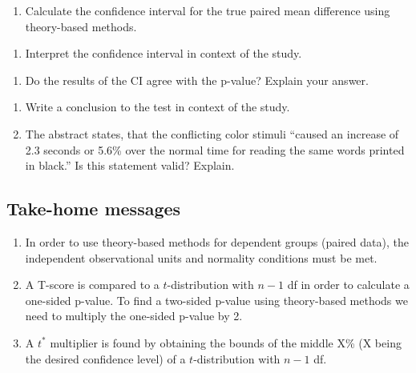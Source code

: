 \documentclass[
]{report}
\providecommand{\tightlist}{%
  \setlength{\itemsep}{0pt}\setlength{\parskip}{0pt}}
\begin{document}
\vspace{0.6in}

\begin{enumerate}
\def\labelenumi{\arabic{enumi}.}
\setcounter{enumi}{12}
\tightlist
\item
  Calculate the confidence interval for the true paired mean difference using theory-based methods.
\end{enumerate}

\newpage

\begin{enumerate}
\def\labelenumi{\arabic{enumi}.}
\setcounter{enumi}{13}
\tightlist
\item
  Interpret the confidence interval in context of the study.
\end{enumerate}

\vspace{1in}

\begin{enumerate}
\def\labelenumi{\arabic{enumi}.}
\setcounter{enumi}{14}
\tightlist
\item
  Do the results of the CI agree with the p-value? Explain your answer.
\end{enumerate}

\vspace{0.5in}

\begin{enumerate}
\def\labelenumi{\arabic{enumi}.}
\setcounter{enumi}{15}
\item
  Write a conclusion to the test in context of the study.
  \vspace{0.6in}
\item
  The abstract states, that the conflicting color stimuli ``caused an increase of 2.3 seconds or 5.6\% over the normal time for reading the same words printed in black.'' Is this statement valid? Explain.
  \vspace{0.6in}
\end{enumerate}

\hypertarget{take-home-messages-18}{%
\subsection{Take-home messages}\label{take-home-messages-18}}

\begin{enumerate}
\def\labelenumi{\arabic{enumi}.}
\item
  In order to use theory-based methods for dependent groups (paired data), the independent observational units and normality conditions must be met.
\item
  A T-score is compared to a \(t\)-distribution with \(n - 1\) df in order to calculate a one-sided p-value. To find a two-sided p-value using theory-based methods we need to multiply the one-sided p-value by 2.
\item
  A \(t^*\) multiplier is found by obtaining the bounds of the middle X\% (X being the desired confidence level) of a \(t\)-distribution with \(n - 1\) df.
\end{enumerate}
\end{document}

